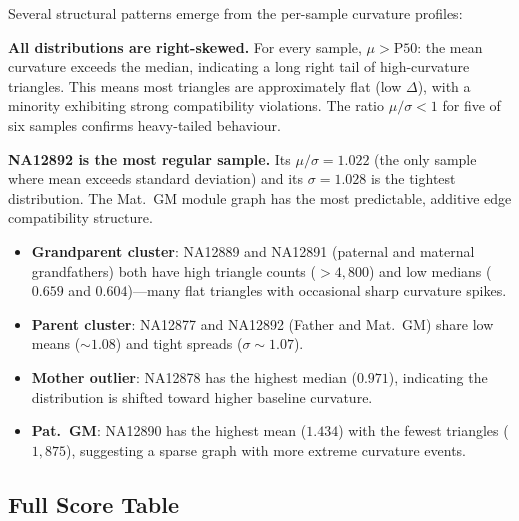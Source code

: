 \documentclass{../yalumba}
\begin{document}
Several structural patterns emerge from the per-sample curvature profiles:

\begin{keyfinding}
\textbf{All distributions are right-skewed.}  For every sample, $\mu > \text{P50}$:
the mean curvature exceeds the median, indicating a long right tail of
high-curvature triangles.  This means most triangles are approximately
flat (low $\Delta$), with a minority exhibiting strong compatibility
violations.  The ratio $\mu/\sigma < 1$ for five of six samples confirms
heavy-tailed behaviour.
\end{keyfinding}

\begin{keyfinding}
\textbf{NA12892 is the most regular sample.}  Its $\mu/\sigma = 1.022$
(the only sample where mean exceeds standard deviation) and its $\sigma =
1.028$ is the tightest distribution.  The Mat.~GM module graph has the most
predictable, additive edge compatibility structure.
\end{keyfinding}

\begin{itemize}
  \item \textbf{Grandparent cluster}: NA12889 and NA12891 (paternal and
    maternal grandfathers) both have high triangle counts ($> 4{,}800$) and
    low medians ($0.659$ and $0.604$)---many flat triangles with occasional
    sharp curvature spikes.
  \item \textbf{Parent cluster}: NA12877 and NA12892 (Father and Mat.~GM)
    share low means ($\sim 1.08$) and tight spreads ($\sigma \sim 1.07$).
  \item \textbf{Mother outlier}: NA12878 has the highest median ($0.971$),
    indicating the distribution is shifted toward higher baseline curvature.
  \item \textbf{Pat.~GM}: NA12890 has the highest mean ($1.434$) with the
    fewest triangles ($1{,}875$), suggesting a sparse graph with more
    extreme curvature events.
\end{itemize}

\subsection{Full Score Table}
\end{document}
